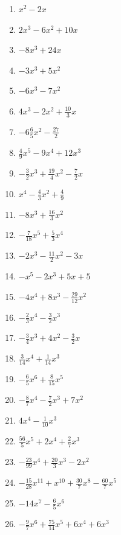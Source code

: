 \newpage
\begin{Answer}[ref=aufloesenA1]

	\begin{minipage}{\textwidth}
		\begin{minipage}{0.46\textwidth}
			\begin{enumerate}[label=\alph*)]
				\item \(x^2-2x\)
				\item \(2x^3-6x^2+10x\)
				\item \(-8x^3+24x\)
				\item \(-3x^3+5x^2\)
				\item \(-6x^3-7x^2\)
				\item \(4x^3-2x^2+\frac{10}{3}x\)
				\item \(-6\frac{6}{5}x^2-\frac{27}{2}\)
				\item \(\frac{4}{9}x^5-9x^4+12x^3\)
				\item \(-\frac{3}{2}x^3+\frac{19}{4}x^2-\frac{7}{2}x\)
				\item \(x^4-\frac{4}{3}x^2+\frac{4}{9}\)
				\item \(-8x^3+\frac{16}{3}x^2\)
				\item \(-\frac{7}{18}x^5+\frac{5}{3}x^4\)
				\item \(-2x^3-\frac{11}{2}x^2-3x\)
			\end{enumerate}
		\end{minipage}%
		\begin{minipage}{0.54\textwidth}
			\begin{enumerate}[label=\alph*)]
				\setcounter{enumi}{13}
				\item \(-x^5-2x^3+5x+5\)
				\item \(-4x^4+8x^3-\frac{29}{12}x^2\)
				\item \(-\frac{2}{3}x^4-\frac{3}{2}x^3\)
				\item \(-\frac{3}{4}x^3+4x^2-\frac{3}{2}x\)
				\item \(\frac{3}{14}x^4+\frac{1}{14}x^3\)
				\item \(-\frac{6}{5}x^6+\frac{8}{15}x^5\)
				\item \(-\frac{8}{7}x^4-\frac{7}{2}x^3+7x^2\)
				\item \(4x^4-\frac{1}{10}x^3\)
				\item \(\frac{56}{5}x^5+2x^4+\frac{2}{7}x^3\)
				\item \(-\frac{23}{99}x^4+\frac{20}{3}x^3-2x^2\)
				\item \(-\frac{15}{28}x^{11}+x^{10}+\frac{30}{7}x^8-\frac{60}{7}x^5\)
				\item \(-14x^7-\frac{6}{5}x^6\)
				\item \(-\frac{9}{7}x^6+\frac{75}{14}x^5+6x^4+6x^3\)
			\end{enumerate}
		\end{minipage}%
	\end{minipage}%
\end{Answer}
